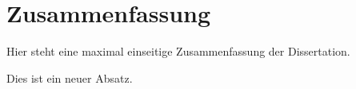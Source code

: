 

\chapter*{Zusammenfassung}

Hier steht eine maximal einseitige Zusammenfassung der
Dissertation.

Dies ist ein neuer Absatz.
